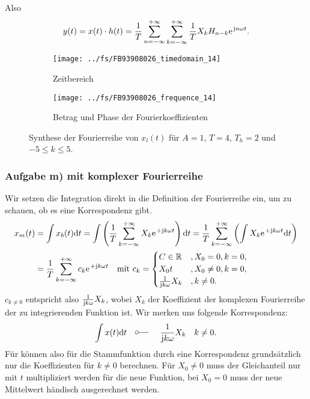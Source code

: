 \documentclass[11pt,a4paper,DIV=12]{scrartcl}
\begin{document}
%
Also
%
\begin{align}
	y(t)=x(t)\cdot h(t)=\frac{1}{T}\sum_{n=-\infty}^{+\infty}\sum_{k=-\infty}^{+\infty}\frac{1}{T}X_kH_{n-k}\e^{\im n \omega t}.
\end{align}
%
\begin{figure}
	\centering
	\begin{subfigure}{\textwidth}
		\texttt{[image: ../fs/FB93908026\_timedomain\_14]}
		\caption{Zeitbereich}
	\end{subfigure}
	\begin{subfigure}{\textwidth}
		\texttt{[image: ../fs/FB93908026\_frequence\_14]}
		\caption{Betrag und Phase der Fourierkoeffizienten}
	\end{subfigure}
	\caption{Synthese der Fourierreihe von $x_l(t)$ für $A=1$, $T=4$, $T_h=2$ und
		$-5\leq k\leq5$.}
\end{figure}
%
\newpage
\subsubsection{Aufgabe m) mit komplexer Fourierreihe}
%
Wir setzen die Integration direkt in die Definition der Fourierreihe ein, um zu
schauen, ob es eine Korrespondenz gibt.
%
%
\begin{align}
	x_m(t)&=\int x_b(t)\diff t
	=\int\left ( \frac{1}{T}\sum_{k=-\infty}^{+\infty}X_k\e^{+\im k \omega t}\right )\diff t
	=\frac{1}{T}\sum_{k=-\infty}^{+\infty}\left (\int X_k\e^{+\im k \omega t}\diff t\right )\nonumber \\
	&=\frac{1}{T}\sum_{k=-\infty}^{+\infty}c_k\e^{+\im k \omega t}\quad\text{mit }c_k
	=
	\begin{cases}
		C\in\mathbb{R}&,X_0=0,k=0,\\
		X_0t&,X_0\neq 0,k=0,\\
		\frac{1}{\im k \omega}X_k&,k\neq 0.
	\end{cases}
\end{align}
%
%
$c_{k\neq 0}$ entspricht also $\frac{1}{\im k \omega }X_k$, wobei $X_k$ der
Koeffizient der komplexen Fourierreihe der zu integrierenden Funktion ist.
%
Wir merken uns folgende Korrespondenz:
%
\begin{align}
	\int x(t)\diff t\quad\fourier\quad \frac{1}{\im k \omega }X_k\quad k\neq 0.
\end{align}
%
Für können also für die Stammfunktion durch eine Korrespondenz grundsätzlich nur
die Koeffizienten für $k\neq 0$ berechnen.
%
Für $X_0\neq 0$ muss der Gleichanteil nur mit $t$ multipliziert werden für die
neue Funktion, bei $X_0=0$ muss der neue Mittelwert händisch ausgerechnet
werden.
%
\newpage
\end{document}
